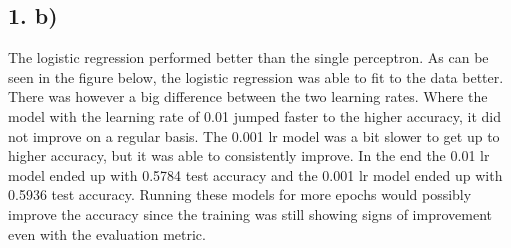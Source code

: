 \documentclass[11pt]{article}
\begin{document}
\subsection{1. b)}
The logistic regression performed better than the single perceptron.
As can be seen in the figure below, the logistic regression was able to fit to the data better.
There was however a big difference between the two learning rates.
Where the model with the learning rate of 0.01 jumped faster to the higher accuracy, it did not improve on a regular basis.
The 0.001 lr model was a bit slower to get up to higher accuracy, but it was able to consistently improve.
In the end the 0.01 lr model ended up with 0.5784 test accuracy and the 0.001 lr model ended up with 0.5936 test accuracy.
Running these models for more epochs would possibly improve the accuracy since the training was still showing signs of improvement even with the evaluation metric.
\end{document}
